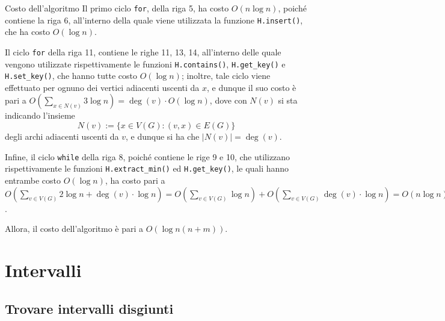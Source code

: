 \documentclass[a4paper, 12pt]{report}
\begin{document}
    \begin{framedobs}{Costo dell'algoritmo}
        Il primo ciclo \texttt{for}, della riga 5, ha costo $O(n \log n)$, poiché contiene la riga 6, all'interno della quale viene utilizzata la funzione \texttt{H.insert()}, che ha costo $O(\log n)$.

        Il ciclo \texttt{for} della riga 11, contiene le righe 11, 13, 14, all'interno delle quale vengono utilizzate rispettivamente le funzioni \texttt{H.contains()}, \texttt{H.get\_key()} e \texttt{H.set\_key()}, che hanno tutte costo $O(\log n)$; inoltre, tale ciclo viene effettuato per ognuno dei vertici adiacenti uscenti da $x$, e dunque il suo costo è pari a $\displaystyle O \left( \sum_{x \in N(v)} 3 \log n \right) = \deg(v) \cdot O(\log n)$, dove con $N(v)$ si sta indicando l'insieme $$N (v) := \{x \in V(G) : (v, x) \in E(G)\}$$ degli archi adiacenti uscenti da $v$, e dunque si ha che $\left|N(v)\right| = \deg(v)$.

        Infine, il ciclo \texttt{while} della riga 8, poiché contiene le rige 9 e 10, che utilizzano rispettivamente le funzioni \texttt{H.extract\_min()} ed \texttt{H.get\_key()}, le quali hanno entrambe costo $O(\log n)$, ha costo pari a $\displaystyle O \left( \sum_{v \in V(G)} 2 \log n + \deg(v) \cdot \log n \right) = O \left( \sum_{v \in V(G)} \log n \right) + O \left ( \sum_{v \in V(G)} \deg(v) \cdot \log n \right) = O(n \log n) + \log n \cdot O (m )$.

        Allora, il costo dell'algoritmo è pari a $O (\log n (n + m))$.
    \end{framedobs}

    \section{Intervalli}

    \subsection{Trovare intervalli disgiunti}
\end{document}
